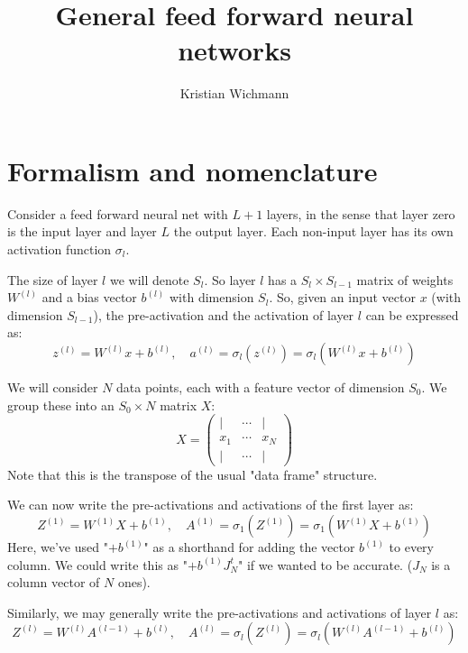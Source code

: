 \documentclass[12pt, a4paper]{article}
\title{General feed forward neural networks}
\author{Kristian Wichmann}
\numberwithin{equation}{section}
\begin{document}
\maketitle

\section{Formalism and nomenclature}
Consider a feed forward neural net with $L+1$ layers, in the sense that layer zero is the input layer and layer $L$ the output layer. Each non-input layer has its own activation function $\sigma_l$.

The size of layer $l$ we will denote $S_l$. So layer $l$ has a $S_l\times S_{l-1}$ matrix of weights $W^{(l)}$ and a bias vector $b^{(l)}$ with dimension $S_l$. So, given an input vector $x$ (with dimension $S_{l-1}$), the pre-activation and the activation of layer $l$ can be expressed as:
\begin{equation}
\label{forward_propagation}
z^{(l)}=W^{(l)} x + b^{(l)},\quad a^{(l)}=\sigma_l(z^{(l)})=\sigma_l(W^{(l)} x + b^{(l)})
\end{equation}

We will consider $N$ data points, each with a feature vector of dimension $S_0$. We group these into an $S_0\times N$ matrix $X$:
\begin{equation}
X=
\begin{pmatrix}
| & \cdots & | \\
x_1 & \cdots & x_N \\
| & \cdots & |
\end{pmatrix}
\end{equation}
Note that this is the transpose of the usual "data frame" structure.

We can now write the pre-activations and activations of the first layer as:
\begin{equation}
Z^{(1)}=W^{(1)} X+b^{(1)},\quad A^{(1)}=\sigma_1(Z^{(1)})=\sigma_1(W^{(1)} X+b^{(1)})
\end{equation}
Here, we've used "$+b^{(1)}$" as a shorthand for adding the vector $b^{(1)}$ to every column. We could write this as "$+b^{(1)} J^t_{N}$" if we wanted to be accurate. ($J_N$ is a column vector of $N$ ones).

Similarly, we may generally write the pre-activations and activations of layer $l$ as:
\begin{equation}
Z^{(l)}=W^{(l)} A^{(l-1)}+b^{(l)},\quad A^{(l)}=\sigma_l(Z^{(l)})=\sigma_l(W^{(l)} A^{(l-1)}+b^{(l)})
\end{equation}
\end{document}
